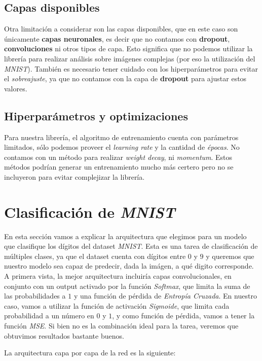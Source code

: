 \documentclass [a4paper,12pt,oneside,final]{article}
\begin{document}
\subsection{Capas disponibles}

Otra limitación a considerar son las capas disponibles, que en este caso son únicamente {\bf capas neuronales}, es decir que no contamos con {\bf dropout}, {\bf convoluciones} ni otros tipos de capa. Esto significa que no podemos utilizar la librería para realizar análisis sobre imágenes complejas (por eso la utilización del {\it MNIST}). También es necesario tener cuidado con los hiperparámetros para evitar el {\it sobreajuste}, ya que no contamos con la capa de {\bf dropout} para ajustar estos valores.

\subsection{Hiperparámetros y optimizaciones}

Para nuestra librería, el algoritmo de entrenamiento cuenta con parámetros limitados, sólo podemos proveer el {\it learning rate} y la cantidad de {\it épocas}. No contamos con un método para realizar {\it weight decay}, ni {\it momentum}. Estos métodos podrían generar un entrenamiento mucho más certero pero no se incluyeron para evitar complejizar la librería.

\section{Clasificación de {\it MNIST}}

En esta sección vamos a explicar la arquitectura que elegimos para un modelo que clasifique los dígitos del dataset {\it MNIST}. Esta es una tarea de clasificación de múltiples clases, ya que el dataset cuenta con dígitos entre $0$ y $9$ y queremos que nuestro modelo sea capaz de predecir, dada la imágen, a qué digito corresponde. A primera vista, la mejor arquitectura incluiría capas convolucionales, en conjunto con un output activado por la función {\it Softmax}, que limita la suma de las probabilidades a $1$ y una función de pérdida de {\it Entropía Cruzada}. En nuestro caso, vamos a utilizar la función de activación {\it Sigmoide}, que limita cada probabilidad a un número en $0$ y $1$, y como función de pérdida, vamos a tener la función {\it MSE}. Si bien no es la combinación ideal para la tarea, veremos que obtuvimos resultados bastante buenos.


La arquitectura capa por capa de la red es la siguiente:
\end{document}
